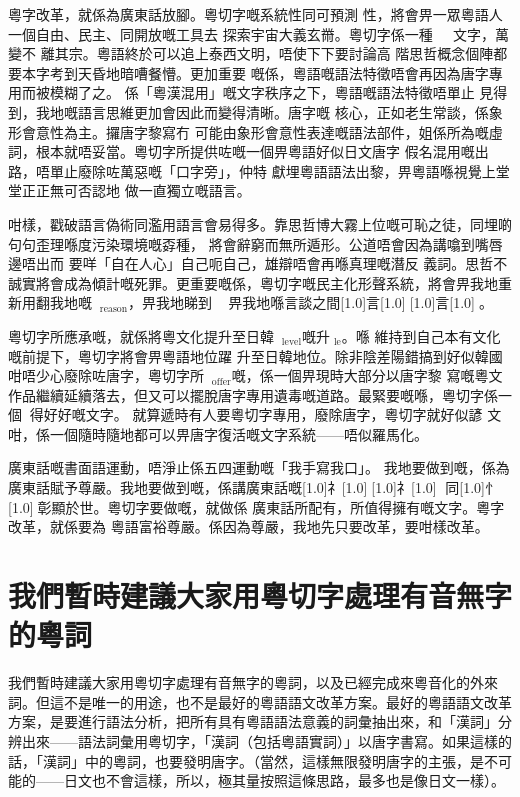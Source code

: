 粵字改革，就係為廣東話放腳。粵切字嘅系統性同可預測 性，將會畀一眾粵語人一個自由、民主、同開放嘅工具去 探索宇宙大義玄黹。粵切字係一種 文字，萬變不 離其宗。粵語終於可以追上泰西文明，唔使下下要討論高 階思哲概念個陣都要本字考到天昏地暗嘈餐懵。更加重要 嘅係，粵語嘅語法特徵唔會再因為唐字專用而被模糊了之。 係「粵漢混用」嘅文字秩序之下，粵語嘅語法特徵唔單止 見得到，我地嘅語言思維更加會因此而變得清晰。唐字嘅 核心，正如老生常談，係象形會意性為主。攞唐字黎寫冇 可能由象形會意性表達嘅語法部件，姐係所為嘅虛詞，根本就唔妥當。粵切字所提供咗嘅一個畀粵語好似日文唐字 假名混用嘅出路，唔單止廢除咗萬惡嘅「口字旁」，仲特 獻埋粵語語法出黎，畀粵語喺視覺上堂堂正正無可否認地 做一直獨立嘅語言。

咁樣，戳破語言偽術同濫用語言會易得多。靠思哲博大霧上位嘅可恥之徒，同埋啲句句歪理喺度污染環境嘅孬種， 將會辭窮而無所遁形。公道唔會因為講噏到嘴唇邊唔出而 要咩「自在人心」自己呃自己，雄辯唔會再喺真理嘅潛反 義詞。思哲不誠實將會成為傾計嘅死罪。更重要嘅係，粵切字嘅民主化形聲系統，將會畀我地重新用翻我地嘅$_{\text{reason}}$，畀我地睇到 ，畀我地喺言談之間\scalebox{0.5}[1.0]{言}\scalebox{0.5}[1.0]{}\scalebox{0.5}[1.0]{言}\scalebox{0.5}[1.0]{}。

粵切字所應承嘅，就係將粵文化提升至日韓$_{\text{level}}$嘅升$_{\text{le}}$。喺 維持到自己本有文化嘅前提下，粵切字將會畀粵語地位躍 升至日韓地位。除非陰差陽錯搞到好似韓國咁唔少心廢除咗唐字，粵切字所$_{\text{offer}}$嘅，係一個畀現時大部分以唐字黎 寫嘅粵文作品繼續延續落去，但又可以擺脫唐字專用遺毒嘅道路。最緊要嘅喺，粵切字係一個得好好嘅文字。 就算遞時有人要粵切字專用，廢除唐字，粵切字就好似諺 文咁，係一個隨時隨地都可以畀唐字復活嘅文字系統——唔似羅馬化。

廣東話嘅書面語運動，唔淨止係五四運動嘅「我手寫我口」。 我地要做到嘅，係為廣東話賦予尊嚴。我地要做到嘅，係講廣東話嘅\scalebox{0.5}[1.0]{礻}\scalebox{0.5}[1.0]{}\scalebox{0.5}[1.0]{礻}\scalebox{0.5}[1.0]{} 同\scalebox{0.5}[1.0]{忄}\scalebox{0.5}[1.0]{}彰顯於世。粵切字要做嘅，就做係 廣東話所配有，所值得擁有嘅文字。粵字改革，就係要為 粵語富裕尊嚴。係因為尊嚴，我地先只要改革，要咁樣改革。




\section{我們暫時建議大家用粵切字處理有音無字的粵詞}

我們暫時建議大家用粵切字處理有音無字的粵詞，以及已經完成來粵音化的外來詞。但這不是唯一的用途，也不是最好的粵語語文改革方案。最好的粵語語文改革方案，是要進行語法分析，把所有具有粵語語法意義的詞彙抽出來，和「漢詞」分辨出來——語法詞彙用粵切字，「漢詞（包括粵語實詞）」以唐字書寫。如果這樣的話，「漢詞」中的粵詞，也要發明唐字。（當然，這樣無限發明唐字的主張，是不可能的——日文也不會這樣，所以，極其量按照這條思路，最多也是像日文一樣）。

